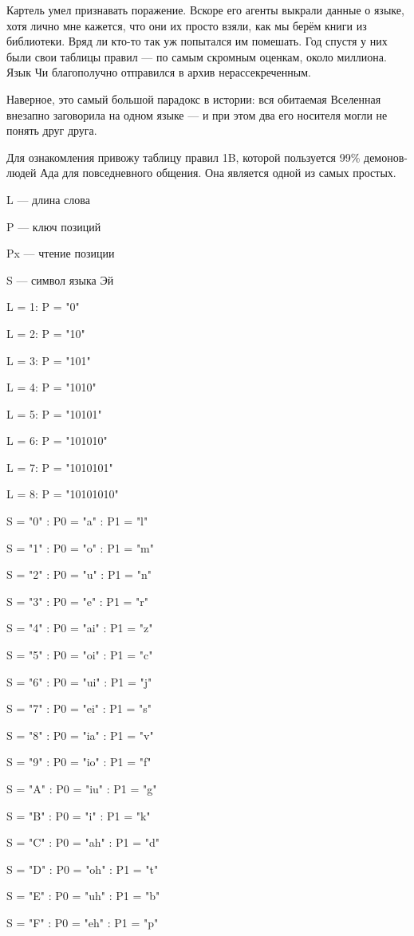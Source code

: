 \documentclass[a4paper,10pt]{book}
\begin{document}
Картель умел признавать поражение. Вскоре его агенты выкрали данные о языке, 
хотя лично мне кажется, что они их просто взяли, как мы берём книги из 
библиотеки. Вряд ли кто-то так уж попытался им помешать. Год спустя у них были 
свои таблицы правил --- по самым скромным оценкам, около миллиона. Язык Чи 
благополучно отправился в архив нерассекреченным.

Наверное, это самый большой парадокс в истории: вся обитаемая Вселенная 
внезапно заговорила на одном языке — и при этом два его носителя могли не 
понять друг друга.

Для ознакомления привожу таблицу правил 1B, которой пользуется 99\% 
демонов-людей Ада для повседневного общения. Она является одной из самых 
простых.

L --- длина слова

P --- ключ позиций

Px --- чтение позиции

S --- символ языка Эй

L = 1: P = "0"

L = 2: P = "10"

L = 3: P = "101"

L = 4: P = "1010"

L = 5: P = "10101"

L = 6: P = "101010"

L = 7: P = "1010101"

L = 8: P = "10101010"

S = "0" : P0 = "a" : P1 = "l"

S = "1" : P0 = "o" : P1 = "m"

S = "2" : P0 = "u" : P1 = "n"

S = "3" : P0 = "e" : P1 = "r"

S = "4" : P0 = "ai" : P1 = "z"

S = "5" : P0 = "oi" : P1 = "c"

S = "6" : P0 = "ui" : P1 = "j"

S = "7" : P0 = "ei" : P1 = "s"

S = "8" : P0 = "ia" : P1 = "v"

S = "9" : P0 = "io" : P1 = "f"

S = "A" : P0 = "iu" : P1 = "g"

S = "B" : P0 = "i" : P1 = "k"

S = "C" : P0 = "ah" : P1 = "d"

S = "D" : P0 = "oh" : P1 = "t"

S = "E" : P0 = "uh" : P1 = "b"

S = "F" : P0 = "eh" : P1 = "p"
\end{document}
